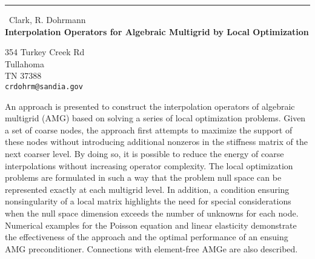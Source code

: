 \documentclass{report}
\begin{document}
\begin{center}
\rule{6in}{1pt} \
{\large Clark, R. Dohrmann \\
{\bf Interpolation Operators for Algebraic Multigrid by Local Optimization}}

354 Turkey Creek Rd \\ Tullahoma \\ TN 37388
\\
{\tt crdohrm@sandia.gov}\end{center}

An approach is presented to construct the interpolation operators of
algebraic multigrid (AMG) based on solving a series of local optimization
problems. Given a set of coarse nodes, the approach first attempts to
maximize the support of these nodes without introducing additional
nonzeros in the stiffness matrix of the next coarser level. By doing so,
it is possible to reduce the energy of coarse interpolations without
increasing operator complexity. The local optimization problems are
formulated in such a way that the problem null space can be represented
exactly at each multigrid level. In addition, a condition ensuring
nonsingularity of a local matrix highlights the need for special
considerations when the null space dimension exceeds the number of
unknowns for each node. Numerical examples for the Poisson equation and
linear elasticity demonstrate the effectiveness of the approach and the
optimal performance of an ensuing AMG preconditioner. Connections with
element-free AMGe are also described.
\end{document}
